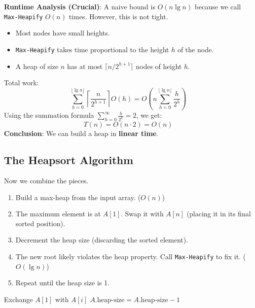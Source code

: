 \documentclass[12pt]{article}
\theoremstyle{blueplain}
\theoremstyle{bluedef}
\theoremstyle{blueremark}
\begin{document}
\noindent \textbf{Runtime Analysis (Crucial)}:
A naive bound is $O(n \lg n)$ because we call \texttt{Max-Heapify} $O(n)$ times. However, this is not tight.
\begin{itemize}
    \item Most nodes have small heights.
    \item \texttt{Max-Heapify} takes time proportional to the height $h$ of the node.
    \item A heap of size $n$ has at most $\lceil n/2^{h+1} \rceil$ nodes of height $h$.
\end{itemize}
Total work:
\[
    \sum_{h=0}^{\lfloor \lg n \rfloor} \left\lceil \frac{n}{2^{h+1}} \right\rceil O(h) = O\left( n \sum_{h=0}^{\lfloor \lg n \rfloor} \frac{h}{2^h} \right)
\]
Using the summation formula $\sum_{h=0}^{\infty} \frac{h}{2^h} = 2$, we get:
\[ T(n) = O(n \cdot 2) = O(n) \]
\textbf{Conclusion}: We can build a heap in \textbf{linear time}.

\subsection{The Heapsort Algorithm}

Now we combine the pieces.
\begin{enumerate}
    \item Build a max-heap from the input array. ($O(n)$)
    \item The maximum element is at $A[1]$. Swap it with $A[n]$ (placing it in its final sorted position).
    \item Decrement the heap size (discarding the sorted element).
    \item The new root likely violates the heap property. Call \texttt{Max-Heapify} to fix it. ($O(\lg n)$)
    \item Repeat until the heap size is 1.
\end{enumerate}

\begin{algorithm}
    \caption{Heapsort}\label{alg:heapsort}
    \begin{algorithmic}[1]
        \State {}
        \State Exchange $A[1]$ with $A[i]$
        \State $A.\text{heap-size} = A.\text{heap-size} - 1$
        \State {}
        \EndFor
        \EndProcedure
    \end{algorithmic}
\end{algorithm}
\end{document}
